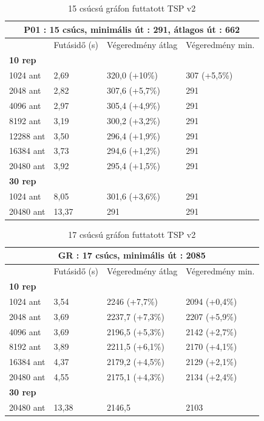 \begin{table}[ht!]
	\centering
	\begin{tabular}{|p{2cm}||p{3cm}|p{3.5cm}|p{3.5cm}|}
		\hline
		\multicolumn{4}{|c|}{P01 : 15 csúcs, minimális út : 291, átlagos út : 662} \\
		\hline
		& Futásidő (s) & Végeredmény átlag & Végeredmény min.\\
		\hline
		\textbf{10 rep} & & &\\
		1024 ant & 2,69 & 320,0 (+10\%) & 307 (+5,5\%) \\
		2048 ant & 2,82 & 307,6 (+5,7\%) & 291\\
		4096 ant & 2,97 & 305,4 (+4,9\%) & 291\\
		8192 ant & 3,19 & 300,2 (+3,2\%) & 291\\
		12288 ant & 3,50 & 296,4 (+1,9\%) & 291\\
		16384 ant & 3,73 & 294,6 (+1,2\%) & 291\\
		20480 ant & 3,92 & 295,4 (+1,5\%) & 291\\
		\hline
		\textbf{30 rep} & & &\\
		1024 ant & 8,05 & 301,6 (+3,6\%) & 291\\
		20480 ant & 13,37 & 291 & 291\\
		\hline
	\end{tabular}
	\caption{15 csúcsú gráfon futtatott TSP v2}
	\label{table:TSPv2_15}
\end{table}

\begin{table}[ht!]
	\centering
	\begin{tabular}{|p{2cm}||p{3cm}|p{3.5cm}|p{3.5cm}|}
		\hline
		\multicolumn{4}{|c|}{GR : 17 csúcs, minimális út : 2085} \\
		\hline
		& Futásidő (s) & Végeredmény átlag & Végeredmény min.\\
		\hline
		\textbf{10 rep} & & & \\
		1024 ant & 3,54 & 2246 (+7,7\%) & 2094 (+0,4\%)\\
		2048 ant & 3,69 & 2237,7 (+7,3\%) & 2207 (+5,9\%)\\
		4096 ant & 3,69 & 2196,5 (+5,3\%) & 2142 (+2,7\%)\\
		8192 ant & 3,89 & 2211,5 (+6,1\%) & 2170 (+4,1\%)\\
		16384 ant & 4,37 & 2179,2 (+4,5\%) & 2129 (+2,1\%)\\
		20480 ant & 4,55 & 2175,1 (+4,3\%) & 2134 (+2,4\%) \\
		\hline
		\textbf{30 rep} & & & \\
		20480 ant & 13,38 & 2146,5 & 2103 \\
		\hline
	\end{tabular}
	\caption{17 csúcsú gráfon futtatott TSP v2}
	\label{table:TSPv2_17}
\end{table}

